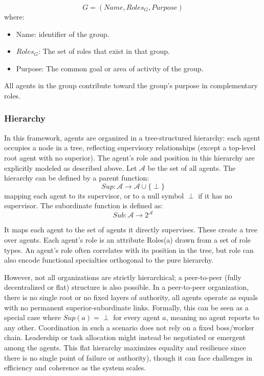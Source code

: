 \begin{equation*}
    G = (Name, Roles_G, Purpose)
\end{equation*}
where:
\begin{itemize}
    \item Name: identifier of the group.
    \item $Roles_G$: The set of roles that exist in that group.
    \item Purpose: The common goal or area of activity of the group.
 \end{itemize}
 All agents in the group contribute toward the group’s purpose in complementary roles. 


\subsubsection{Hierarchy}
In this framework, agents are organized in a tree-structured hierarchy: each agent occupies a node in a tree, reflecting supervisory relationships (except a top-level root agent with no superior). The agent’s role and position in this hierarchy are explicitly modeled as described above. Let $\mathcal{A}$ be the set of all agents. The hierarchy can be defined by a parent function:
\begin{equation*}
    Sup:\mathcal{A}\rightarrow \mathcal{A} \cup \{\perp\}
\end{equation*}
mapping each agent to its supervisor, or to a null symbol $\perp$ if it has no supervisor. The subordinate function is defined as:
\begin{equation*}
    Sub:\mathcal{A}\rightarrow 2^{\mathcal{A}} 
\end{equation*}

It maps each agent to the set of agents it directly supervises. These create a tree over agents. Each agent’s role is an attribute Roles(a) drawn from a set of role types. An agent’s role often correlates with its position in the tree, but role can also encode functional specialties orthogonal to the pure hierarchy. 


However, not all organizations are strictly hierarchical; a peer-to-peer (fully decentralized or flat) structure is also possible. In a peer-to-peer organization, there is no single root or no fixed layers of authority, all agents operate as equals with no permanent superior-subordinate links. Formally, this can be seen as a special case where $Sup(a) = \perp$ for every agent $a$, meaning no agent reports to any other. Coordination in such a scenario does not rely on a fixed boss/worker chain. Leadership or task allocation might instead be negotiated or emergent among the agents. This flat hierarchy maximizes equality and resilience since there is no single point of failure or authority), though it can face challenges in efficiency and coherence as the system scales.


